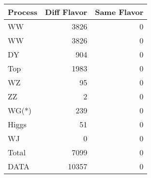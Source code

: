 \begin{table}[ht]
	\centering
\begin{tabular}{lrr}

Process &  Diff Flavor &  Same Flavor \\
		\hline
     WW &         3826 &            0 \\
     WW &         3826 &            0 \\
     DY &          904 &            0 \\
    Top &         1983 &            0 \\
     WZ &           95 &            0 \\
     ZZ &            2 &            0 \\
  WG(*) &          239 &            0 \\
  Higgs &           51 &            0 \\
     WJ &            0 &            0 \\
\hline
  Total &         7099 &            0 \\
   DATA &        10357 &            0 \\


\end{tabular}

\end{table}